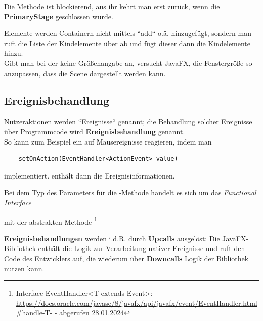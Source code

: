 \begin{tcolorbox}
    Die Methode  ist blockierend, aus ihr kehrt man erst zurück, wenn die \textbf{PrimaryStage} geschlossen wurde.
\end{tcolorbox}

\noindent
Elemente werden Containern nicht mittels ``add`` o.ä. hinzugefügt, sondern man ruft die Liste der Kindelemente über  ab und fügt dieser dann die Kindelemente hinzu.\\

\noindent
Gibt man bei der  keine Größenangabe an, versucht JavaFX, die Fenstergröße so anzupassen, dass die Scene dargestellt werden kann.

\subsection{Ereignisbehandlung}

Nutzeraktionen werden ``Ereignisse`` genannt; die Behandlung solcher Ereignisse über Programmcode wird \textbf{Ereignisbehandlung} genannt.\\

\noindent
So kann zum Beispiel ein  auf Mausereignisse reagieren, indem man

\begin{verbatim}
    setOnAction(EventHandler<ActionEvent> value)
\end{verbatim}

implementiert.  enthält dann die Ereignisinformationen.

\begin{tcolorbox}
    Bei dem Typ des Parameters für die -Methode handelt es sich um das \textit{Functional Interface}
     \begin{center}
     \end{center}
    mit der abstrakten Methode \footnote{
        Interface EventHandler<T extends Event>: \url{https://docs.oracle.com/javase/8/javafx/api/javafx/event/EventHandler.html#handle-T-} - abgerufen 28.01.2024
    }
\end{tcolorbox}

\noindent
\textbf{Ereignisbehandlungen} werden i.d.R. durch \textbf{Upcalls} ausgelöst: Die JavaFX-Bibliothek enthält die Logik zur Verarbeitung nativer Ereignisse und ruft den Code des Entwicklers auf, die wiederum über \textbf{Downcalls} Logik der Bibliothek nutzen kann.

